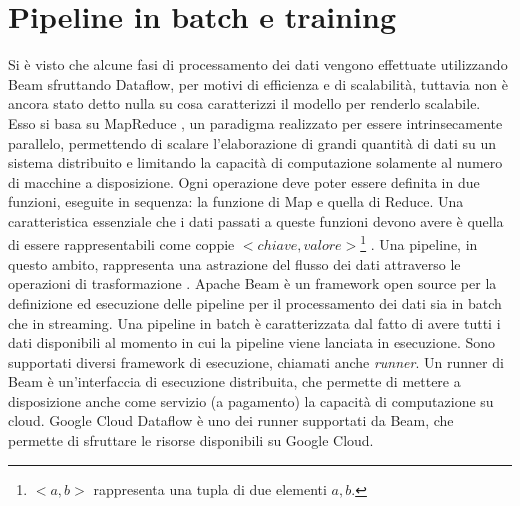 \chapter{Pipeline in batch e training}\label{pipelinebatch}
Si è visto che alcune fasi di processamento dei dati vengono effettuate utilizzando Beam sfruttando Dataflow, per motivi di efficienza e di scalabilità, tuttavia non è ancora stato detto nulla su cosa caratterizzi il modello per renderlo scalabile. Esso si basa su MapReduce \cite{white_2012}, un paradigma realizzato per essere intrinsecamente parallelo, permettendo di scalare l'elaborazione di grandi quantità di dati su un sistema distribuito e limitando la capacità di computazione solamente al numero di macchine a disposizione. Ogni operazione deve poter essere definita in due funzioni, eseguite in sequenza: la funzione di Map e quella di Reduce. Una caratteristica essenziale che i dati passati a queste funzioni devono avere è quella di essere rappresentabili come coppie $ <chiave, valore> $\footnote{$ <a,b> $ rappresenta una tupla di due elementi $ a, b $.} . Una pipeline, in questo ambito, rappresenta una astrazione del flusso dei dati attraverso le operazioni di trasformazione \cite{apachebeam}.
Apache Beam è un framework open source per la definizione ed esecuzione delle pipeline per il processamento dei dati sia in batch che in streaming. Una pipeline in batch è caratterizzata dal fatto di avere tutti i dati disponibili al momento in cui la pipeline viene lanciata in esecuzione. Sono supportati diversi framework di esecuzione, chiamati anche \textit{runner}. Un runner di Beam è un’interfaccia di esecuzione distribuita, che permette di mettere a disposizione anche come servizio (a pagamento) la capacità di computazione su cloud. Google Cloud Dataflow è uno dei runner supportati da Beam, che permette di sfruttare le risorse disponibili su Google Cloud.
